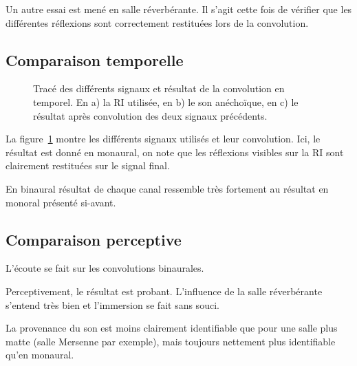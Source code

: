 Un autre essai est mené en salle réverbérante. Il s'agit cette fois de vérifier que les différentes réflexions sont
correctement restituées lors de la convolution.

\subsection{Comparaison temporelle} %

\begin{figure}[h!]
	\caption{\label{temporel_reverb}Tracé des différents signaux et résultat de la convolution en temporel. En a) la
    RI utilisée, en b) le son anéchoïque, en c) le résultat après convolution des deux signaux précédents.}
\end{figure}

La figure~\ref{temporel_reverb} montre les différents signaux utilisés et leur convolution. Ici, le résultat est donné
en monaural, on note que les réflexions visibles sur la RI sont clairement restituées sur le signal final.

En binaural résultat de chaque canal ressemble très fortement au résultat en monoral présenté si-avant.

\subsection{Comparaison perceptive} %

L'écoute se fait sur les convolutions binaurales.

Perceptivement, le résultat est probant. L'influence de la salle réverbérante s'entend très bien et l'immersion se fait
sans souci.

La provenance du son est moins clairement identifiable que pour une salle plus matte (salle Mersenne par exemple),
mais toujours nettement plus identifiable qu'en monaural.

